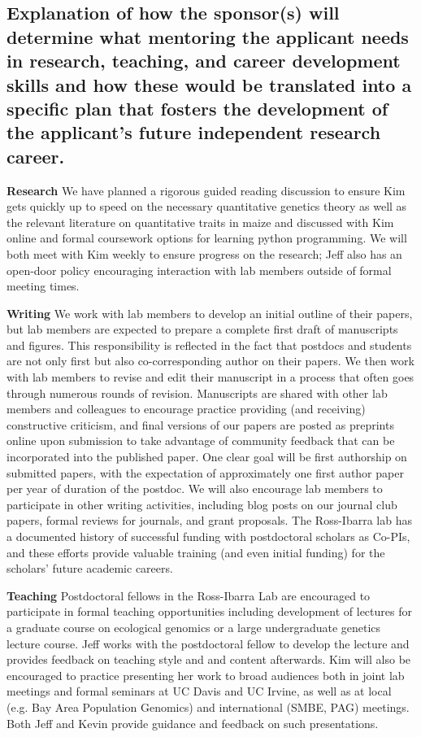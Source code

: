 \subsection{Explanation of how the sponsor(s) will determine what mentoring the applicant needs in research, teaching, and career development skills and how these would be translated into a specific plan that fosters the development of the applicant's future independent research career.}

\textbf{Research} We have planned a rigorous guided reading discussion to ensure Kim gets quickly up to speed on the necessary quantitative genetics theory as well as the relevant literature on quantitative traits in maize and discussed with Kim online and formal coursework options for learning python programming. We will both meet with Kim weekly to ensure progress on the research; Jeff also has an open-door policy encouraging interaction with lab members outside of formal meeting times.

\textbf{Writing} We work with lab members to develop an initial outline of their papers, but lab members are expected to prepare a complete first draft of manuscripts and figures. This responsibility is reflected in the fact that postdocs and students are not only first but also co-corresponding author on their papers. We then work with lab members to revise and edit their manuscript in a process that often goes through numerous rounds of revision. Manuscripts are shared with other lab members and colleagues to encourage practice providing (and receiving) constructive criticism, and final versions of our papers are posted as preprints online upon submission to take advantage of community feedback that can be incorporated into the published paper.  One clear goal will be first authorship on submitted papers, with the expectation of approximately one first author paper per year of duration of the postdoc.  We will also encourage lab members to participate in other writing activities, including blog posts on our journal club papers, formal reviews for journals, and grant proposals.  The Ross-Ibarra lab has a documented history of successful funding with postdoctoral scholars as Co-PIs, and these efforts provide valuable training (and even initial funding) for the scholars' future academic careers.  

\textbf{Teaching}  Postdoctoral fellows in the Ross-Ibarra Lab are encouraged to participate in formal teaching opportunities including development of lectures for a graduate course on ecological genomics or a large undergraduate genetics lecture course.  Jeff works with the postdoctoral fellow to develop the lecture and provides feedback on teaching style and and content afterwards. Kim will also be encouraged to practice presenting her work to broad audiences both in joint lab meetings and formal seminars at UC Davis and UC Irvine, as well as at local (e.g. Bay Area Population Genomics) and international (SMBE, PAG) meetings. Both Jeff and Kevin provide guidance and feedback on such presentations. 

